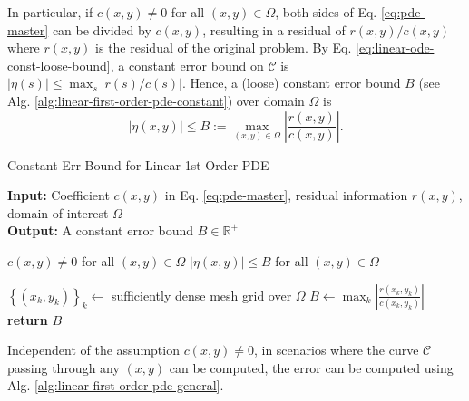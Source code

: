\documentclass[accepted]{uai2023}
\newcommand{\Err}{\eta}
\begin{document}
    In particular, if $c(x, y) \neq 0$ for all $(x, y) \in \Omega$, both sides of Eq. \ref{eq:pde-master} can be divided by $c(x, y)$, resulting in a residual of $r(x, y)/c(x, y)$ where $r(x, y)$ is the residual of the original problem. 
    By Eq. \ref{eq:linear-ode-const-loose-bound}, a constant error bound on $\mathcal{C}$ is $|\Err(s)| \leq \max_{s}\left|r(s)/c(s)\right|$. 
    Hence, a (loose) constant error bound $B$ (see Alg. \ref{alg:linear-first-order-pde-constant}) over domain $\Omega$ is
    {
        \small
        \begin{equation}
            |\Err(x, y)| \leq B :=\max_{(x, y)\in \Omega}\left|\frac{r(x, y)}{c(x, y)}\right|.
        \end{equation}
    }

    \begin{algorithm}
        \small
        \caption{Constant Err Bound for Linear 1st-Order PDE}\label{alg:linear-first-order-pde-constant}
        \textbf{Input:} Coefficient $c(x, y)$ in Eq. \ref{eq:pde-master}, residual information $r(x, y)$, domain of interest $\Omega$\\
        \textbf{Output:} A constant error bound $B \in \mathbb{R}^+$
        \begin{algorithmic}
            \Require $c(x, y) \neq 0$ for all $(x, y) \in \Omega$
            \Ensure $|\Err(x, y)| \leq B$ for all $(x, y) \in \Omega$

            \State $\left\{(x_k, y_k)\right\}_{k} \gets$ sufficiently dense mesh grid over $\Omega$
            \State $\displaystyle B \gets \max_{k} \left| \frac{r(x_k, y_k)}{c(x_k, y_k)}\right|$
            \vspace{-0.25em}
            \State \textbf{return} $B$
        \end{algorithmic}
    \end{algorithm}

    Independent of the assumption $c(x, y)\neq 0$, in scenarios where the curve $\mathcal{C}$ passing through any $(x, y)$ can be computed, the error can be computed using Alg. \ref{alg:linear-first-order-pde-general}.
\end{document}
